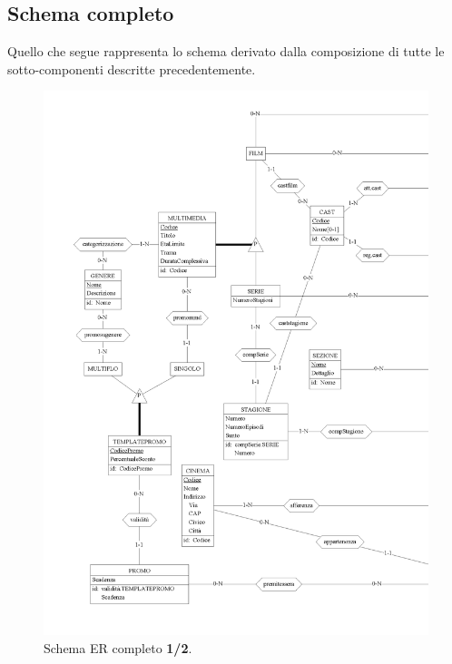 \documentclass[a4paper,12pt]{report}
\begin{document}
	\subsection{Schema completo}
	Quello che segue rappresenta lo schema derivato dalla composizione di tutte le sotto-componenti descritte precedentemente.
	\begin{figure}[H]
		\centering
		\includegraphics[width=430pt]{ER/ercompletosx.png}
		\caption{Schema ER completo \textbf{1/2}.}
	\end{figure}
\end{document}
